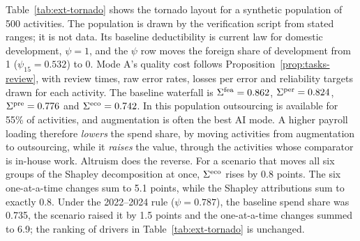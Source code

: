 Table~\ref{tab:ext-tornado} shows the tornado layout for a synthetic population of 500 activities. The population is drawn by the verification script from stated ranges; it is not data. Its baseline deductibility is current law for domestic development, $\psi=1$, and the $\psi$ row moves the foreign share of development from 1 ($\psi_{15}=0.532$) to 0. Mode A's quality cost follows Proposition~\ref{prop:tasks-review}, with review times, raw error rates, losses per error and reliability targets drawn for each activity. The baseline waterfall is $\Sigma^{\rm fea}=0.862$, $\Sigma^{\rm per}=0.824$, $\Sigma^{\rm pre}=0.776$ and $\Sigma^{\rm eco}=0.742$. In this population outsourcing is available for 55\% of activities, and augmentation is often the best AI mode. A higher payroll loading therefore \emph{lowers} the spend share, by moving activities from augmentation to outsourcing, while it \emph{raises} the value, through the activities whose comparator is in-house work. Altruism does the reverse. For a scenario that moves all six groups of the Shapley decomposition at once, $\Sigma^{\rm eco}$ rises by 0.8 points. The six one-at-a-time changes sum to 5.1 points, while the Shapley attributions sum to exactly 0.8. Under the 2022--2024 rule ($\psi=0.787$), the baseline spend share was 0.735, the scenario raised it by 1.5 points and the one-at-a-time changes summed to 6.9; the ranking of drivers in Table~\ref{tab:ext-tornado} is unchanged.

